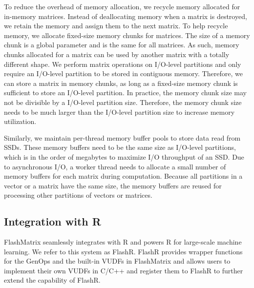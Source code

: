 To reduce the overhead of memory allocation, we recycle memory allocated for
in-memory matrices. Instead of deallocating memory when a matrix is destroyed,
we retain the memory and assign them to the next matrix. To help recycle memory,
we allocate fixed-size memory chunks for matrices. The size of a memory chunk
is a global parameter and is the same for all 
matrices. As such, memory chunks allocated for a matrix can be used by another
matrix with a totally different shape. We perform matrix operations on
I/O-level partitions and only require an I/O-level partition to be stored in
contiguous memory. Therefore, we can store a matrix in memory chunks,
as long as a fixed-size memory chunk is sufficient
to store an I/O-level partition. In practice, the memory chunk size may
not be divisible by a I/O-level partition size. Therefore, the memory chunk
size needs to be much larger than the I/O-level partition size to increase
memory utilization.

Similarly, we maintain per-thread memory buffer pools to store data read from
SSDs. These memory buffers need to be
the same size as I/O-level partitions, which is in the order of megabytes
to maximize I/O throughput of an SSD. Due to asynchronous I/O, a worker thread
needs to allocate a small number of memory buffers for each matrix
during computation. Because all partitions in a vector or a matrix have
the same size, the memory buffers are reused for processing other partitions
of vectors or matrices.


\subsection{Integration with R}

FlashMatrix seamlessly integrates with R and powers R for large-scale machine
learning. We refer to this system as FlashR. FlashR provides wrapper functions
for the GenOps and the built-in VUDFs in FlashMatrix and allows users to
implement their own VUDFs in C/C++ and register them to FlashR to further
extend the capability of FlashR.

